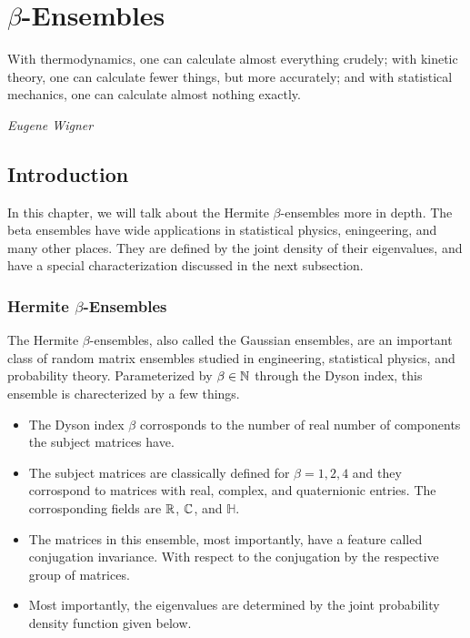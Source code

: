 
\chapter{$\beta$-Ensembles}

\epigraph{With thermodynamics, one can calculate almost everything crudely; with kinetic theory, one can calculate fewer things, but more accurately; and with statistical mechanics, one can calculate almost nothing exactly.}{\textit{Eugene Wigner}}

\section{Introduction}

In this chapter, we will talk about the Hermite $\beta$-ensembles more in depth. The beta ensembles have wide applications in statistical physics, eningeering, and many other places. They are defined by the joint density of their eigenvalues, and have a special characterization discussed in the next subsection.


\subsection{Hermite $\beta$-Ensembles}

The Hermite $\beta$-ensembles, also called the Gaussian ensembles, are an important class of random matrix ensembles studied in engineering, statistical physics, and probability theory. Parameterized by $\beta \in \mathbb{N}$ through the Dyson index, this ensemble is charecterized by a few things.

\begin{itemize}
  \item The Dyson index $\beta$ corrosponds to the number of real number of components the subject matrices have.
  \item The subject matrices are classically defined for $\beta = 1,2,4$ and they corrospond to matrices with real, complex, and quaternionic entries. The corrosponding fields are $\mathbb{R}$, $\mathbb{C}$, and $\mathbb{H}$.
  \item The matrices in this ensemble, most importantly, have a feature called conjugation invariance. With respect to the conjugation by the respective group of matrices.
  \item Most importantly, the eigenvalues are determined by the joint probability density function given below.
\end{itemize}

